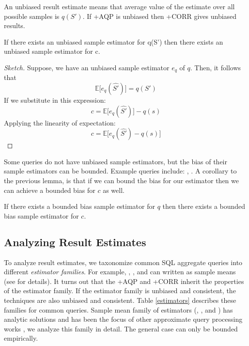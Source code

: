 
An unbiased result estimate means that average value of the estimate over all possible samples is $q(S')$.
If \svcnospace+AQP is unbiased then \svcnospace+CORR gives unbiased results.
\begin{lemma}\label{lemma:unbiased}
If there exists an unbiased sample estimator for q(S') then there exists an unbiased sample estimator for c.
\end{lemma}
\begin{proof}[Sketch] 
Suppose, we have an unbiased sample estimator $e_q$ of $q$. 
Then, it follows that \[\mathbb{E}\big[e_q(\hat{S'})\big] = q(S')\]
If we substitute in this expression:
\[ c = \mathbb{E}\big[e_q(\hat{S'})\big] -q(s) \] 
Applying the linearity of expectation:
\[ c = \mathbb{E}\big[e_q(\hat{S'}) - q(s)\big] \]
\end{proof}
Some queries do not have unbiased sample estimators, but the bias of their sample estimators can be bounded. Example queries include: \medfunc, \percfunc.
A corollary to the previous lemma, is that if we can bound the bias for our estimator then we can achieve a bounded bias for $c$ as well.
\begin{corollary}
If there exists a bounded bias sample estimator for $q$ then there exists a bounded bias sample estimator for $c$.
\end{corollary}

\subsection{Analyzing Result Estimates}
To analyze result estimates, we taxonomize common SQL aggregate queries into different \emph{estimator families}.
For example, \sumfunc, \countfunc, and \avgfunc can written as sample means (see \cite{wang1999sample} for details).
It turns out that the \svcnospace+AQP and \svcnospace+CORR inherit the properties of the estimator family.
If the estimator family is unbiased and consistent, the techniques are also unbiased and consistent.
Table \ref{estimators} describes these families for common queries.
Sample mean family of estimators (\sumfunc, \countfunc, and \avgfunc) has analytic solutions and has been the focus of other approximate query processing works \cite{OlkenR86, wang1999sample}, we analyze this family in detail.
The general case can only be bounded empirically.

